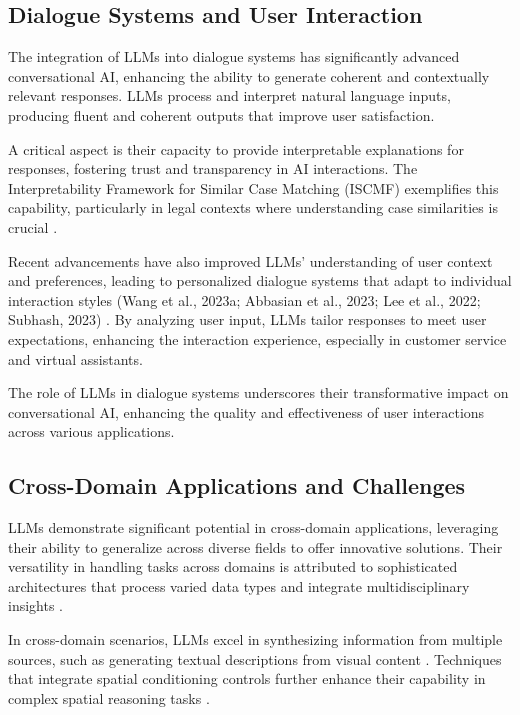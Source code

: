 \subsection{Dialogue Systems and User Interaction} \label{subsec:Dialogue Systems and User Interaction}

The integration of LLMs into dialogue systems has significantly advanced conversational AI, enhancing the ability to generate coherent and contextually relevant responses. LLMs process and interpret natural language inputs, producing fluent and coherent outputs that improve user satisfaction.

A critical aspect is their capacity to provide interpretable explanations for responses, fostering trust and transparency in AI interactions. The Interpretability Framework for Similar Case Matching (ISCMF) exemplifies this capability, particularly in legal contexts where understanding case similarities is crucial \cite{lin2023interpretabilityframeworksimilarcase}. 

Recent advancements have also improved LLMs' understanding of user context and preferences, leading to personalized dialogue systems that adapt to individual interaction styles (Wang et al., 2023a; Abbasian et al., 2023; Lee et al., 2022; Subhash, 2023) \cite{tao2024rolecraftglmadvancingpersonalizedroleplaying}. By analyzing user input, LLMs tailor responses to meet user expectations, enhancing the interaction experience, especially in customer service and virtual assistants.

The role of LLMs in dialogue systems underscores their transformative impact on conversational AI, enhancing the quality and effectiveness of user interactions across various applications.

\subsection{Cross-Domain Applications and Challenges} \label{subsec:Cross-Domain Applications and Challenges}

LLMs demonstrate significant potential in cross-domain applications, leveraging their ability to generalize across diverse fields to offer innovative solutions. Their versatility in handling tasks across domains is attributed to sophisticated architectures that process varied data types and integrate multidisciplinary insights \cite{korre2023takesvillagemultidisciplinaritycollaboration}.

In cross-domain scenarios, LLMs excel in synthesizing information from multiple sources, such as generating textual descriptions from visual content \cite{zhang2024universaladversarialperturbationsvisionlanguage}. Techniques that integrate spatial conditioning controls further enhance their capability in complex spatial reasoning tasks \cite{zhang2023adding}.


